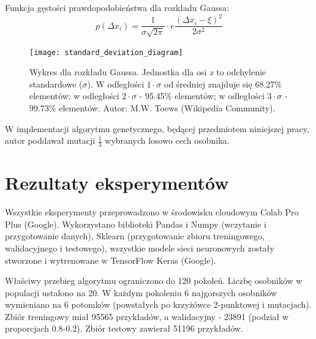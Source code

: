 \documentclass[a4paper,12pt]{article}
\numberwithin{figure}{section}
\begin{document}
    \bigskip

    \noindent
    \begin{minipage}[H]{\textwidth}
        \setlength\parindent{17pt} Funkcja gęstości prawdopodobieństwa dla rozkładu Gaussa: \\
        \begin{equation}
            \label{eq:mutation_probability distribution}
            p(\Delta x_{i}) = \frac{1}{\sigma \sqrt {2 \pi}} \cdot e \frac{(\Delta x_{i} - \xi)^{2}}{2 \sigma^{2}}
        \end{equation}
    \end{minipage}

    \bigskip

    \begin{figure}[H]
        \centering
        \texttt{[image: standard\_deviation\_diagram]}
        \caption{Wykres dla rozkładu Gaussa. Jednostka dla osi \textit{x} to odchylenie standardowe ($\sigma$). W odległości $1 \cdot \sigma$ od średniej znajduje się 68.27\% elementów; w odległości $2 \cdot \sigma$ - 95.45\% elementów; w odległości $3 \cdot \sigma$ - 99.73\% elementów. Autor: M.W. Toews (Wikipedia Community).}
        \label{fig:standard_deviation_diagram}
    \end{figure}

    \bigskip

    W implementacji algorytmu genetycznego, będącej przedmiotem niniejszej pracy, autor poddawał mutacji $\frac{1}{3}$ wybranych losowo cech osobnika.

    \newpage


    \section{Rezultaty eksperymentów}

    Wszystkie eksperymenty przeprowadzono w środowisku cloudowym Colab Pro Plus (Google). Wykorzystano biblioteki Pandas i Numpy (wczytanie i przygotowanie danych), Sklearn (przygotowanie zbioru treningowego, walidacyjnego i testowego), wszystkie modele sieci neuronowych zostały stworzone i wytrenowane w TensorFlow Keras (Google).

    \bigskip

    Właściwy przebieg algorytmu ograniczono do 120 pokoleń. Liczbę osobników w populacji ustalono na 20. W każdym pokoleniu 6 najgorszych osobników wymieniano na 6 potomków (powstałych po krzyżówce 2-punktowej i mutacjach). Zbiór treningowy miał 95565 przykładów, a walidacyjny - 23891 (podział w proporcjach 0.8-0.2). Zbiór testowy zawierał 51196 przykładów.
\end{document}
